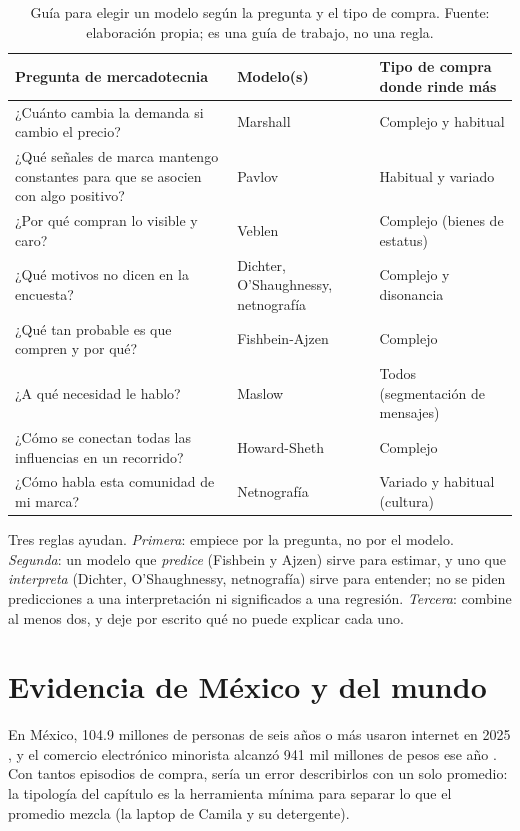 \begin{table}[!htb]
\centering
\footnotesize
\begin{tabular}{@{}>{\raggedright}p{5.6cm}>{\raggedright}p{2.7cm}>{\raggedright\arraybackslash}p{3.5cm}@{}}
\toprule
Pregunta de mercadotecnia & Modelo(s) & Tipo de compra donde rinde más \\
\midrule
¿Cuánto cambia la demanda si cambio el precio? & Marshall & Complejo y habitual \\
¿Qué señales de marca mantengo constantes para que se asocien con algo positivo? & Pavlov & Habitual y variado \\
¿Por qué compran lo visible y caro? & Veblen & Complejo (bienes de estatus) \\
¿Qué motivos no dicen en la encuesta? & Dichter, O'Shaughnessy, netnografía & Complejo y disonancia \\
¿Qué tan probable es que compren y por qué? & Fishbein-Ajzen & Complejo \\
¿A qué necesidad le hablo? & Maslow & Todos (segmentación de mensajes) \\
¿Cómo se conectan todas las influencias en un recorrido? & Howard-Sheth & Complejo \\
¿Cómo habla esta comunidad de mi marca? & Netnografía & Variado y habitual (cultura) \\
\bottomrule
\end{tabular}
\caption{Guía para elegir un modelo según la pregunta y el tipo de compra.
Fuente: elaboración propia; es una guía de trabajo, no una regla.}
\label{tab:cap09-eleccion}
\end{table}

Tres reglas ayudan. \emph{Primera}: empiece por la pregunta, no por el
modelo. \emph{Segunda}: un modelo que \emph{predice} (Fishbein y Ajzen) sirve para
estimar, y uno que \emph{interpreta} (Dichter, O'Shaughnessy, netnografía) sirve
para entender; no se piden predicciones a una interpretación ni significados a
una regresión. \emph{Tercera}: combine al menos dos, y deje por escrito qué
no puede explicar cada uno.

\section{Evidencia de México y del mundo}

En México, 104.9 millones de personas de seis años o más usaron internet en
2025 \parencite{inegi2026endutih}, y el comercio electrónico minorista alcanzó
941 mil millones de pesos ese año \parencite{amvo2026}. Con tantos episodios
de compra, sería un error describirlos con un solo promedio: la tipología del
capítulo es la herramienta mínima para separar lo que el promedio mezcla
(la laptop de Camila y su detergente).

